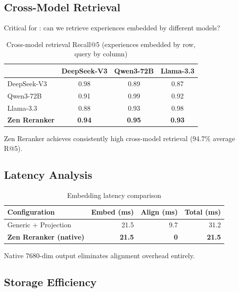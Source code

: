 \subsection{Cross-Model Retrieval}

Critical for \DSO{}: can we retrieve experiences embedded by different models?

\begin{table}[h]
\centering
\caption{Cross-model retrieval Recall@5 (experiences embedded by row, query by column)}
\label{tab:crossmodel}
\begin{tabular}{lccc}
\toprule
 & \textbf{DeepSeek-V3} & \textbf{Qwen3-72B} & \textbf{Llama-3.3} \\
\midrule
DeepSeek-V3 & 0.98 & 0.89 & 0.87 \\
Qwen3-72B & 0.91 & 0.99 & 0.92 \\
Llama-3.3 & 0.88 & 0.93 & 0.98 \\
\textbf{Zen Reranker} & \textbf{0.94} & \textbf{0.95} & \textbf{0.93} \\
\bottomrule
\end{tabular}
\end{table}

Zen Reranker achieves consistently high cross-model retrieval (94.7\% average R@5).

\subsection{Latency Analysis}

\begin{table}[h]
\centering
\caption{Embedding latency comparison}
\label{tab:latency}
\begin{tabular}{lrrr}
\toprule
\textbf{Configuration} & \textbf{Embed (ms)} & \textbf{Align (ms)} & \textbf{Total (ms)} \\
\midrule
Generic + Projection & 21.5 & 9.7 & 31.2 \\
\textbf{Zen Reranker (native)} & \textbf{21.5} & \textbf{0} & \textbf{21.5} \\
\bottomrule
\end{tabular}
\end{table}

Native 7680-dim output eliminates alignment overhead entirely.

\subsection{Storage Efficiency}

